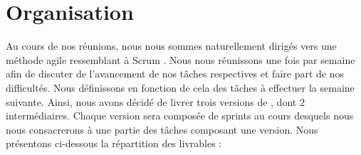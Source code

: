 \section{Organisation}
	\label{sec:livrables}

	Au cours de nos réunions, nous nous sommes naturellement dirigés vers une méthode agile ressemblant à \og Scrum \fg. Nous nous réunissons une fois par semaine afin de discuter de l'avancement de nos tâches respectives et faire part de nos difficultés. Nous définissons en fonction de cela des tâches à effectuer la semaine suivante. Ainsi, nous avons décidé de livrer trois versions de \glasir{}, dont 2 intermédiaires.
	Chaque version sera composée de sprints au cours desquels nous nous consacrerons à une partie des tâches composant une version. %
	Nous présentons ci-dessous la répartition des livrables :

	


